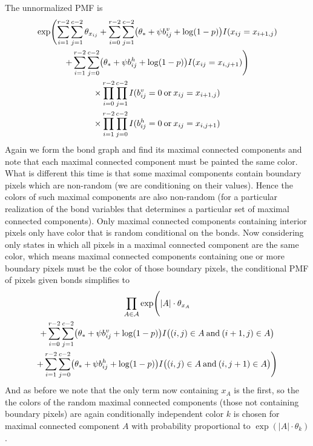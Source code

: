 \documentclass[11pt]{article}
\newcommand{\opor}{\mathbin{\rm or}}
\newcommand{\opand}{\mathbin{\rm and}}
\newcommand{\abs}[1]{\lvert #1 \rvert}
\begin{document}
The unnormalized PMF is
\begin{multline*}
   \exp\Biggl(
   \sum_{i = 1}^{r - 2}
   \sum_{j = 1}^{c - 2}
   \theta_{x_{i j}}
   +
   \sum_{i = 0}^{r - 2}
   \sum_{j = 1}^{c - 2}
   \bigl( \theta_* + \psi b^v_{i j} + \log(1 - p) \bigr)
   I(x_{i j} = x_{i + 1, j})
   \\
   +
   \sum_{i = 1}^{r - 2}
   \sum_{j = 0}^{c - 2}
   \bigl( \theta_* + \psi b^h_{i j} + \log(1 - p) \bigr)
   I(x_{i j} = x_{i, j + 1})
   \Biggr)
   \\
   \times
   \prod_{i = 0}^{r - 2}
   \prod_{j = 1}^{c - 2}
   I(b^v_{i j} = 0 \opor x_{i j} = x_{i + 1, j})
   \\
   \times
   \prod_{i = 1}^{r - 2}
   \prod_{j = 0}^{c - 2}
   I(b^h_{i j} = 0 \opor x_{i j} = x_{i, j + 1})
\end{multline*}
Again we form the bond graph and find its maximal connected components
and note that each maximal connected component must be painted the same
color.  What is different this time is that some maximal components contain
boundary pixels which are non-random (we are conditioning on their values).
Hence the colors of such maximal components are also non-random (for a
particular realization of the bond variables that determines a particular
set of maximal connected components).  Only maximal connected components
containing interior pixels only have color that is random conditional
on the bonds.  Now considering only states in which all pixels in a
maximal connected component are the same color, which means maximal connected
components containing one or more boundary pixels must be the color of those
boundary pixels, the conditional PMF of pixels given bonds simplifies to
\begin{multline*}
   \prod_{A \in \mathcal{A}}
   \exp\Biggl(
   \abs{A} \cdot \theta_{x_A}
   \\
   +
   \sum_{i = 0}^{r - 2}
   \sum_{j = 1}^{c - 2}
   \bigl( \theta_* + \psi b^v_{i j} + \log(1 - p) \bigr)
   I\bigl((i, j) \in A \opand (i + 1, j) \in A\bigr)
   \\
   +
   \sum_{i = 1}^{r - 2}
   \sum_{j = 0}^{c - 2}
   \bigl( \theta_* + \psi b^h_{i j} + \log(1 - p) \bigr)
   I\bigl((i, j) \in A \opand (i, j + 1) \in A \bigr)
   \Biggr)
\end{multline*}
And as before we note that the only term now containing $x_A$ is the first,
so the the colors of the random maximal connected components (those not
containing boundary pixels) are again conditionally independent
color $k$ is chosen for maximal connected component $A$
with probability proportional to $\exp( \abs{A} \cdot \theta_k )$.
\end{document}

